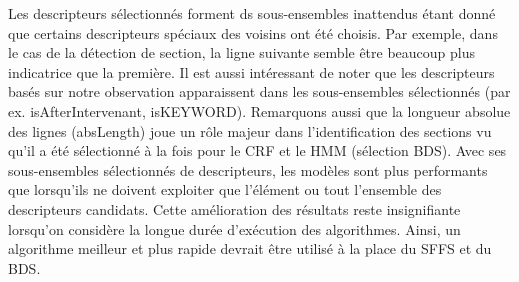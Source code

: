Les descripteurs sélectionnés forment ds sous-ensembles inattendus étant donné que certains descripteurs spéciaux des voisins ont été choisis. Par exemple, dans le cas de la détection de section, la ligne suivante semble être beaucoup plus indicatrice que la première. Il est aussi intéressant de noter que les descripteurs basés sur notre observation apparaissent dans les sous-ensembles sélectionnés (par ex. isAfterIntervenant, isKEYWORD). Remarquons aussi que la longueur absolue des lignes (absLength)  joue un rôle majeur dans l'identification des sections vu qu'il a été sélectionné à la fois pour le CRF et le HMM (sélection BDS). Avec ses sous-ensembles sélectionnés de descripteurs, les modèles sont plus performants que lorsqu'ils ne doivent exploiter que l'élément ou tout l'ensemble des descripteurs candidats.  Cette amélioration des résultats reste insignifiante lorsqu'on considère la longue durée d'exécution des algorithmes. Ainsi, un algorithme meilleur et plus rapide devrait être utilisé à la place du SFFS et du BDS.

